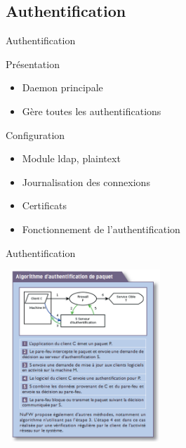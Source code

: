 \documentclass[t,12pt]{beamer}
\begin{document}
	  \subsection{Authentification}
	  \begin{frame}{Authentification}                                                         %
		\begin{block}{Présentation}
		  \begin{itemize}
		    \item Daemon principale
		    \item Gère toutes les authentifications	    
	    \end{itemize}
		\end{block}
		
		\begin{block}{Configuration}
		  \begin{itemize}
		    \item Module ldap, plaintext
		    \item Journalisation des connexions
		    \item Certificats		    
	    \end{itemize}
		\end{block}
		
		\begin{itemize}
		\item Fonctionnement de l'authentification
	  \end{itemize}
	  \end{frame} 


	  \begin{frame}{Authentification}                                                         %
		  \begin{center}
		    \includegraphics[width=6cm,height=6.5cm]{images/auth.png}
		  \end{center}
	  \end{frame} 
\end{document}
